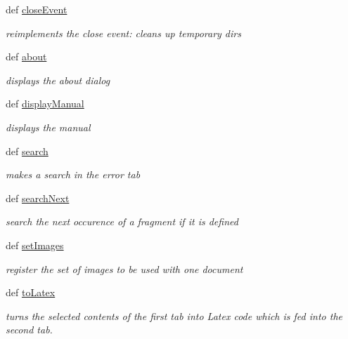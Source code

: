 \begin{DoxyCompactItemize}
\item 
def \hyperlink{classuicilibris_1_1w2mMainWindow_a00095aa6235477d728057cf9d7d6221a}{close\-Event}
\begin{DoxyCompactList}\small\item\em reimplements the close event\-: cleans up temporary dirs \end{DoxyCompactList}\item 
def \hyperlink{classuicilibris_1_1w2mMainWindow_a30da63be175a0f4c8f942b25c7092d60}{about}
\begin{DoxyCompactList}\small\item\em displays the about dialog \end{DoxyCompactList}\item 
def \hyperlink{classuicilibris_1_1w2mMainWindow_a9e24390ca18a0b41afa56c6b24f7d06b}{display\-Manual}
\begin{DoxyCompactList}\small\item\em displays the manual \end{DoxyCompactList}\item 
def \hyperlink{classuicilibris_1_1w2mMainWindow_a0e9674456559e4ae92ade2c99cf93d7b}{search}
\begin{DoxyCompactList}\small\item\em makes a search in the error tab \end{DoxyCompactList}\item 
def \hyperlink{classuicilibris_1_1w2mMainWindow_a588c437ad13c0313a23eda4d4fbe6334}{search\-Next}
\begin{DoxyCompactList}\small\item\em search the next occurence of a fragment if it is defined \end{DoxyCompactList}\item 
def \hyperlink{classuicilibris_1_1w2mMainWindow_a1a1b41e898d650d99ee9de7c0f423ac8}{set\-Images}
\begin{DoxyCompactList}\small\item\em register the set of images to be used with one document \end{DoxyCompactList}\item 
def \hyperlink{classuicilibris_1_1w2mMainWindow_a2572ed1ecb17d7984699be7fd2b4c16f}{to\-Latex}
\begin{DoxyCompactList}\small\item\em turns the selected contents of the first tab into \-Latex code which is fed into the second tab. \end{DoxyCompactList}\item 

\end{DoxyCompactItemize}
